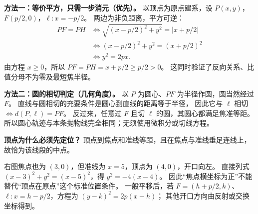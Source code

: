 \clearpage
\begin{proofbox}
\textbf{方法一：等价平方，只需一步消元（优先）。}
以顶点为原点建系，设 $P(x,y)$，$F(p/2,0)$，$\ell:x=-p/2$。
两边为非负距离，平方可逆：
\[
\begin{aligned}
PF=PH&\iff \sqrt{(x-p/2)^2+y^2}=|x+p/2|\\
&\iff (x-p/2)^2+y^2=(x+p/2)^2\\
&\iff \boxed{y^2=2px}.
\end{aligned}
\]
由方程 $x\ge0$，所以 $PF=PH=x+p/2\ge p/2>0$。
这同时验证了反向关系、比值分母不为零及最短焦半径。

\textbf{方法二：圆的相切判定（几何角度）。}
以 $P$ 为圆心、$PF$ 为半径作圆，圆当然经过 $F$。
直线与圆相切的充要条件是圆心到直线的距离等于半径，
因此它与 $\ell$ 相切 $\iff d(P,\ell)=PF$。
反过来，任意过 $F$ 且切 $\ell$ 的圆，其圆心都满足焦准等距。
所以圆心轨迹与本条抛物线完全相同；无须使用微积分或切线方程。
\end{proofbox}
\clearpage
\begin{proofbox}
\textbf{顶点为什么必须先定位？}
顶点到焦点和准线等距，且在焦点与准线垂足连线上，故恰为该线段的中点。

右图焦点也为 $(3,0)$，但准线为 $x=5$，顶点为 $(4,0)$，开口向左。
直接列式 $(x-3)^2+y^2=(x-5)^2$，得 $y^2=-4(x-4)$。
因此“焦点横坐标为正”不能替代“顶点在原点”这个标准位置条件。
一般平移后，若 $F=(h+p/2,k)$、$\ell:x=h-p/2$，方程为 $(y-k)^2=2p(x-h)$；
其他开口方向由反射或交换坐标得到。
\end{proofbox}

